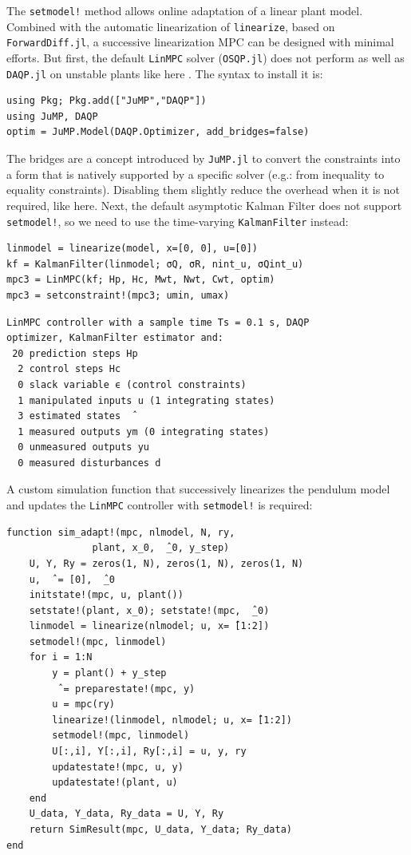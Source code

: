 The \texttt{setmodel!} method allows online adaptation of a linear plant model. Combined with the automatic linearization of \texttt{linearize}, based on \texttt{ForwardDiff.jl}, a successive linearization MPC can be designed with minimal efforts. But first, the default \texttt{LinMPC} solver (\texttt{OSQP.jl}) does not perform as well as \texttt{DAQP.jl} on unstable plants like here \citep{daqp}. The syntax to install it is: 
\begin{verbatim}
using Pkg; Pkg.add(["JuMP","DAQP"])
using JuMP, DAQP
optim = JuMP.Model(DAQP.Optimizer, add_bridges=false)
\end{verbatim}
The bridges are a concept introduced by \texttt{JuMP.jl} to convert the constraints into a form that is natively supported by a specific solver (e.g.: from inequality to equality constraints). Disabling them slightly reduce the overhead when it is not required, like here. Next, the default asymptotic Kalman Filter does not support \texttt{setmodel!}, so we need to use the time-varying \texttt{KalmanFilter} instead:
\begin{verbatim}
linmodel = linearize(model, x=[0, 0], u=[0])
kf = KalmanFilter(linmodel; σQ, σR, nint_u, σQint_u)
mpc3 = LinMPC(kf; Hp, Hc, Mwt, Nwt, Cwt, optim)
mpc3 = setconstraint!(mpc3; umin, umax)
\end{verbatim}
\spacerepl
\begin{verbatim}
LinMPC controller with a sample time Ts = 0.1 s, DAQP
optimizer, KalmanFilter estimator and:
 20 prediction steps Hp
  2 control steps Hc
  0 slack variable ϵ (control constraints)
  1 manipulated inputs u (1 integrating states)
  3 estimated states  ̂
  1 measured outputs ym (0 integrating states)
  0 unmeasured outputs yu
  0 measured disturbances d
\end{verbatim}
A custom simulation function that successively linearizes the pendulum model and updates the \texttt{LinMPC} controller with \texttt{setmodel!} is required: 
\begin{verbatim}
function sim_adapt!(mpc, nlmodel, N, ry, 
               plant, x_0,  ̂_0, y_step)
    U, Y, Ry = zeros(1, N), zeros(1, N), zeros(1, N)
    u,  ̂ = [0],  ̂_0
    initstate!(mpc, u, plant())
    setstate!(plant, x_0); setstate!(mpc,  ̂_0)
    linmodel = linearize(nlmodel; u, x= ̂[1:2])
    setmodel!(mpc, linmodel)
    for i = 1:N
        y = plant() + y_step
         ̂ = preparestate!(mpc, y)
        u = mpc(ry)
        linearize!(linmodel, nlmodel; u, x= ̂[1:2])
        setmodel!(mpc, linmodel) 
        U[:,i], Y[:,i], Ry[:,i] = u, y, ry
        updatestate!(mpc, u, y)
        updatestate!(plant, u)
    end
    U_data, Y_data, Ry_data = U, Y, Ry
    return SimResult(mpc, U_data, Y_data; Ry_data)
end
\end{verbatim}
